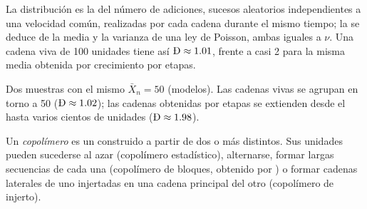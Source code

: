 \admitted

La distribución es la del número de adiciones, sucesos aleatorios independientes a una velocidad común, realizadas
por cada cadena durante el mismo tiempo; la  se deduce de la media y la varianza de una ley de Poisson,
ambas iguales a $\nu$. Una cadena viva de 100 unidades tiene así $\text{\DH} \approx 1.01$, frente a casi 2 para
la misma media obtenida por crecimiento por etapas.

\begin{omfigure}

{\small Dos muestras con el mismo $\bar X_n = 50$ (modelos). Las cadenas vivas se agrupan en torno a 50 ($\text{\DH}
\approx 1.02$); las cadenas obtenidas por etapas se extienden desde el  hasta varios cientos de unidades ($\text{\DH} \approx
1.98$).}
\end{omfigure}

\begin{definition}[Copolímero]\label{def:b2:polymer-synthesis:copolymer}
Un \emph{copolímero} es un  construido a partir de dos o más  distintos. Sus unidades
pueden sucederse al azar (copolímero estadístico), alternarse, formar largas secuencias de cada una (copolímero
de bloques, obtenido por ) o formar cadenas laterales de uno injertadas en una cadena principal del otro
(copolímero de injerto).
\end{definition}

